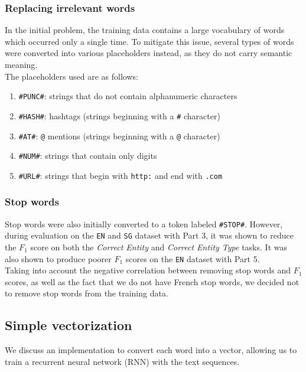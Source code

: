 \documentclass{article}
\numberwithin{equation}{section}
\begin{document}
\subsubsection{Replacing irrelevant words}
In the initial problem, the training data contains a large vocabulary of words which occurred only a single time. To mitigate this issue, several types of words were converted into various placeholders instead, as they do not carry semantic meaning. \\

The placeholders used are as follows:
\begin{enumerate}
	\item \lstinline{#PUNC#}: strings that do not contain alphanumeric characters
	\item \lstinline{#HASH#}: hashtags (strings beginning with a \lstinline{#} character)
	\item \lstinline{#AT#}: \lstinline{@} mentions (strings beginning with a \lstinline{@} character)
	\item \lstinline{#NUM#}: strings that contain only digits
	\item \lstinline{#URL#}: strings that begin with \lstinline{http:} and end with \lstinline{.com}
\end{enumerate}

\subsubsection{Stop words}
Stop words were also initially converted to a token labeled \lstinline{#STOP#}. However, during evaluation on the \lstinline{EN} and \lstinline{SG} dataset with Part 3, it was shown to reduce the $F_1$ score on both the \emph{Correct Entity} and \emph{Correct Entity Type} tasks. It was also shown to produce poorer $F_1$ scores on the \lstinline{EN} dataset with Part 5. \\

Taking into account the negative correlation between removing stop words and $F_1$ scores, as well as the fact that we do not have French stop words, we decided not to remove stop words from the training data.


\subsection{Simple vectorization}
We discuss an implementation to convert each word into a vector, allowing us to train a recurrent neural network (RNN) with the text sequences.
\end{document}
